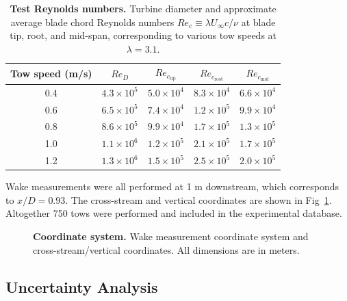 \documentclass[10pt,letterpaper]{article}
\begin{document}
\begin{table}
\centering
\begin{tabular}{c|c|c|c|c}
Tow speed (m/s) & $Re_D$ & $Re_{c_\mathrm{tip}}$ & $Re_{c_\mathrm{root}}$ & $Re_{c_\mathrm{mid}}$\\
\hline
0.4 & $4.3 \times 10^5$ & $5.0 \times 10^4$ & $8.3 \times 10^4$ & $6.6 \times 10^4$ \\
0.6 & $6.5 \times 10^5$ & $7.4 \times 10^4$ & $1.2 \times 10^5$ & $9.9 \times 10^4$ \\
0.8 & $8.6 \times 10^5$ & $9.9 \times 10^4$ & $1.7 \times 10^5$ & $1.3 \times 10^5$ \\
1.0 & $1.1 \times 10^6$ & $1.2 \times 10^5$ & $2.1 \times 10^5$ & $1.7 \times 10^5$ \\
1.2 & $1.3 \times 10^6$ & $1.5 \times 10^5$ & $2.5 \times 10^5$ & $2.0 \times 10^5$ \\
\end{tabular}

\caption{{\bf Test Reynolds numbers.} Turbine diameter and approximate average
blade chord Reynolds numbers $Re_c \equiv \lambda U_\infty c / \nu$ at blade
tip, root, and mid-span, corresponding to various tow speeds at $\lambda=3.1$.}

\label{tab:re}
\end{table}

Wake measurements were all performed at 1 m downstream, which corresponds to
$x/D = 0.93$. The cross-stream and vertical coordinates are shown in
Fig~\ref{fig:coordinates}. Altogether 750 tows were performed and included in
the experimental database.

\begin{figure}

    \caption{{\bf Coordinate system.} Wake measurement coordinate system and
    cross-stream/vertical coordinates. All dimensions are in meters.}

    \label{fig:coordinates}
\end{figure}


\subsection*{Uncertainty Analysis}
\end{document}
